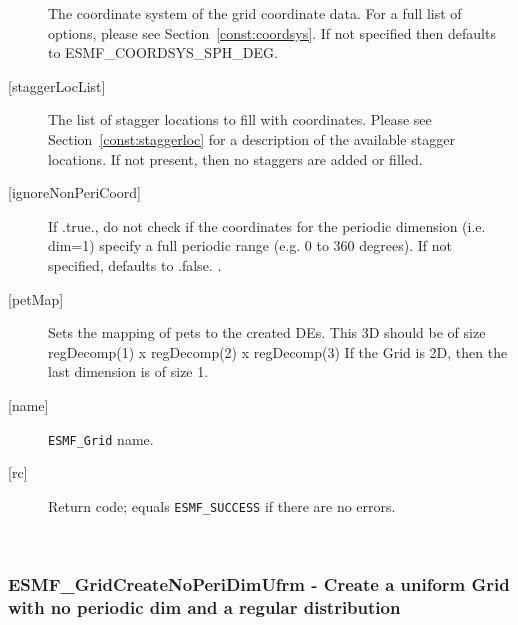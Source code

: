 \begin{description}
       The coordinate system of the grid coordinate data.
       For a full list of options, please see Section~\ref{const:coordsys}.
       If not specified then defaults to ESMF\_COORDSYS\_SPH\_DEG.
   \item[{[staggerLocList]}]
       The list of stagger locations to fill with coordinates. Please see Section~\ref{const:staggerloc}
       for a description of the available stagger locations. If not present, then
       no staggers are added or filled.
   \item[{[ignoreNonPeriCoord]}]
       If .true., do not check if the coordinates for the periodic dimension (i.e. dim=1) specify a full periodic range (e.g. 0 to 360 degrees).
       If not specified, defaults to .false. .
   \item[{[petMap]}]
         Sets the mapping of pets to the created DEs. This 3D
         should be of size regDecomp(1) x regDecomp(2) x regDecomp(3)
         If the Grid is 2D, then the last dimension is of size 1.
   \item[{[name]}]
        {\tt ESMF\_Grid} name.
   \item[{[rc]}]
        Return code; equals {\tt ESMF\_SUCCESS} if there are no errors.
   \end{description}
   
 
\mbox{}\hrulefill\ 
 
\subsubsection [ESMF\_GridCreateNoPeriDimUfrm] {ESMF\_GridCreateNoPeriDimUfrm - Create a uniform Grid with no periodic dim and a regular distribution}


